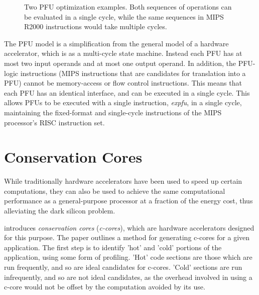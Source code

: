 \documentclass{UoYCSproject}
\begin{document}
\begin{figure}[hbt]
\caption{Two PFU optimization examples. Both sequences of operations can be evaluated in a single cycle, while the same sequences in MIPS R2000 instructions would take multiple cycles. \cite{high-performance-microarchitecture}}
\end{figure}

The PFU model is a simplification from the general model of a hardware accelerator, which is as a multi-cycle state machine.
Instead each PFU has at most two input operands and at most one output operand. In addition, the PFU-logic instructions (MIPS
instructions that are candidates for translation into a PFU) cannot be memory-access or flow control instructions. This means
that each PFU has an identical interface, and can be executed in a single cycle. This allows PFUs to be executed with a single
instruction, \textit{expfu}, in a single cycle, maintaining the fixed-format and single-cycle instructions of the MIPS
processor's RISC instruction set.

\section{Conservation Cores}

While traditionally hardware accelerators have been used to speed up certain computations, they can also be used to achieve the
same computational performance as a general-purpose processor at a fraction of the energy cost, thus alleviating the dark silicon
problem.

\cite{c-cores} introduces \textit{conservation cores} (\textit{c-cores}), which are hardware accelerators
designed for this purpose. The paper outlines a method for generating c-cores for a given application.
The first step is to identify 'hot' and 'cold' portions of the application, using some form of profiling.
'Hot' code sections are those which are run frequently, and so are ideal candidates for c-cores. 'Cold' sections
are run infrequently, and so are not ideal candidates, as the overhead involved in using a c-core would
not be offset by the computation avoided by its use.
\end{document}
